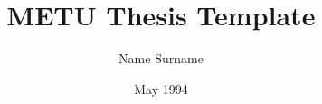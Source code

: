 \documentclass[chaparabic,ceng,ms,12pt,oneandhalf]{metu}
\author{Name Surname}
\title{METU Thesis Template}
\date{May 1994}
\begin{document}
\begin{preliminaries}


\end{preliminaries}
%   
% 
%

\setlength{\parindent}{0em}
\setlength{\parskip}{10pt}








%
%

%

% 
\end{document}
